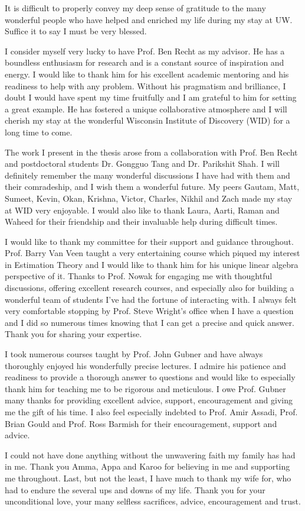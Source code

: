 It is difficult to properly convey my deep sense of gratitude to the many
wonderful people who have helped and enriched my life during my stay at UW. Suffice it to say I must be very blessed.

I consider myself very lucky to have Prof. Ben Recht as my advisor. He has a
boundless enthusiasm for research and is a constant source of inspiration and
energy. I would like to thank him for his excellent academic mentoring and his
readiness to help with any problem. Without his pragmatism and brilliance, I
doubt I would have spent my time fruitfully and I am grateful to him for setting
a great example. He has fostered a unique collaborative atmosphere and I will
cherish my stay at the wonderful Wisconsin Institute of Discovery (WID) for a
long time to come.

The work I present in the thesis arose from a collaboration with Prof. Ben Recht
and postdoctoral students Dr. Gongguo Tang and Dr. Parikshit Shah. I will
definitely remember the many wonderful discussions I have had with them and
their comradeship, and I wish them a wonderful future. My peers Gautam, Matt,
Sumeet, Kevin, Okan, Krishna, Victor, Charles, Nikhil and Zach made my stay at
WID very enjoyable. I would also like to thank Laura, Aarti, Raman and Waheed
for their friendship and their invaluable help during difficult times.

I would like to thank my committee for their support and guidance throughout.
Prof. Barry Van Veen taught a very entertaining course which piqued my interest
in Estimation Theory and I would like to thank him for his unique linear algebra
perspective of it. Thanks to Prof. Nowak for engaging me with thoughtful
discussions, offering excellent research courses, and especially also for
building a wonderful team of students I've had the fortune of interacting with.
I always felt very comfortable stopping by Prof. Steve Wright's office when I
have a question and I did so numerous times knowing that I can get a precise and
quick answer. Thank you for sharing your expertise.

I took numerous courses taught by Prof. John Gubner and have always thoroughly
enjoyed his wonderfully precise lectures. I admire his patience and readiness to
provide a thorough answer to questions and would like to especially thank him
for teaching me to be rigorous and meticulous. I owe Prof. Gubner many thanks
for providing excellent advice, support, encouragement and giving me the gift of
his time. I also feel especially indebted to Prof. Amir Assadi, Prof. Brian
Gould and Prof. Ross Barmish for their encouragement, support and advice.

I could not have done anything without the unwavering faith my family has had in
me. Thank you Amma, Appa and Karoo for believing in me and supporting me
throughout. Last, but not the least, I have much to thank my wife for, who had
to endure the several ups and downs of my life. Thank you for your unconditional
love, your many selfless sacrifices, advice, encouragement and trust. 
